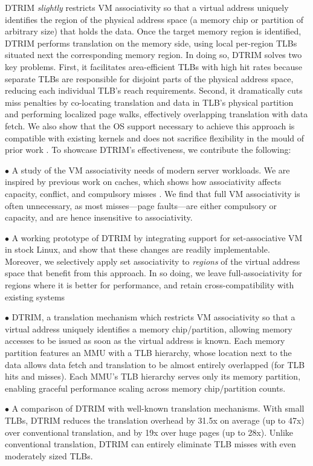 DTRIM {\it slightly} restricts VM associativity so that a virtual
address uniquely identifies the region of the physical address space
(a memory chip or partition of arbitrary size) that holds the
data. Once the target memory region is identified, DTRIM performs
translation on the memory side, using local per-region TLBs situated
next the corresponding memory region. In doing so, DTRIM solves two
key problems. First, it facilitates area-efficient TLBs with high hit
rates because separate TLBs are responsible for disjoint parts of the
physical address space, reducing each individual TLB's reach
requirements. Second, it dramatically cuts miss penalties by
co-locating translation and data in TLB's physical partition and
performing localized page walks, effectively overlapping translation
with data fetch. We also show that the OS support necessary to achieve
this approach is compatible with existing kernels and does not
sacrifice flexibility in the mould of prior work \cite{basu:efficient,
  haria:devirtualizing}. To showcase DTRIM's effectiveness, we
contribute the following:

\noindent $\bullet$ A study of the VM associativity needs of modern
server workloads. We are inspired by previous work on caches, which
shows how associativity affects capacity, conflict, and compulsory
misses \cite{hill:case}. We find that full VM associativity is often
unnecessary, as most misses---page faults---are either compulsory or
capacity, and are hence insensitive to associativity. 

\noindent $\bullet$ A working prototype of DTRIM by integrating
support for set-associative VM in stock Linux, and show that these
changes are readily implementable. Moreover, we selectively apply set
associativity to {\it regions} of the virtual address space that
benefit from this approach. In so doing, we leave full-associativity
for regions where it is better for performance, and retain
cross-compatibility with existing systems

\noindent $\bullet$ DTRIM, a translation mechanism which restricts VM
associativity so that a virtual address uniquely identifies a memory
chip/partition, allowing memory accesses to be issued as soon as the
virtual address is known. Each memory partition features an MMU with a
TLB hierarchy, whose location next to the data allows data fetch and
translation to be almost entirely overlapped (for TLB hits and
misses). Each MMU's TLB hierarchy serves only its memory partition,
enabling graceful performance scaling across memory chip/partition
counts.

\noindent $\bullet$ A comparison of DTRIM with well-known translation
mechanisms. With small TLBs, DTRIM reduces the translation overhead 
by 31.5x on average (up to 47x) over conventional translation, and by 19x over huge 
pages (up to 28x). Unlike conventional translation, DTRIM can entirely eliminate TLB 
misses with even moderately sized TLBs.